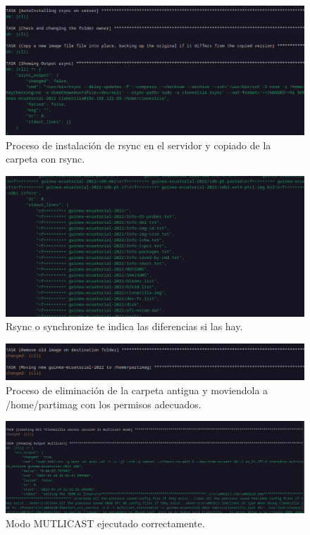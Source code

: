 \begin{figure}[H]
	\centering
	\includegraphics[scale=0.30]{provisioning-ocs/provisioning03}
	\caption{Proceso de instalación de rsync en el servidor y copiado de la carpeta con rsync.}
\end{figure}

\begin{figure}[H]
	\centering
	\includegraphics[scale=0.30]{provisioning-ocs/provisioning05}
	\caption{Rsync o synchronize te indica las diferencias si las hay.}
\end{figure}

\begin{figure}[H]
	\centering
	\includegraphics[scale=0.30]{provisioning-ocs/provisioning04}
	\caption{Proceso de eliminación de la carpeta antigua y moviendola a /home/partimag con los permisos adecuados.}
\end{figure}

\begin{figure}[H]
	\centering
	\includegraphics[scale=0.30]{provisioning-ocs/provisioning06}
	\caption{Modo MUTLICAST ejecutado correctamente.}
\end{figure}

